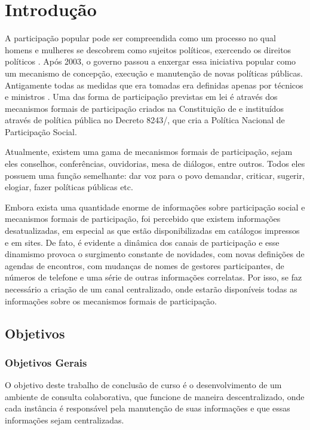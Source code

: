 \chapter{Introdução}

A participação popular pode ser compreendida como um processo no qual homens e mulheres se descobrem como sujeitos políticos, exercendo os direitos políticos \cite{almeida2011participacao}. Após 2003, o governo passou a enxergar essa iniciativa popular como um mecanismo de concepção, execução e manutenção de novas políticas públicas. Antigamente todas as medidas que era tomadas era definidas apenas por técnicos e ministros \cite{sgpr2010conselhos}.
%
Uma das forma de participação previstas em lei é através dos mecanismos formais de participação criados na Constituição de \citeyear{cf} e instituídos através de política pública no Decreto 8243/\citeyear{decreto8243}, que cria a Política Nacional de Participação Social.

Atualmente, existem uma gama de mecanismos formais de participação, sejam eles conselhos, conferências, ouvidorias, mesa de diálogos, entre outros. Todos eles possuem uma função semelhante: dar voz para o povo demandar, criticar, sugerir, elogiar, fazer políticas públicas etc. 

Embora exista uma quantidade enorme de informações sobre participação social e mecanismos formais de participação, foi percebido que existem informações desatualizadas, em especial as que estão disponibilizadas em catálogos impressos e em sites.
%
De fato, é evidente a dinâmica dos canais de participação e esse dinamismo provoca o surgimento constante de novidades, com novas definições de agendas de encontros, com mudanças de nomes de gestores participantes, de números de telefone e uma série de outras informações correlatas. Por isso, se faz necessário a criação de um canal centralizado, onde estarão disponíveis todas as informações sobre os mecanismos formais de participação.

\section{Objetivos}

\subsection{Objetivos Gerais}

O objetivo deste trabalho de conclusão de curso é o desenvolvimento de um ambiente de consulta colaborativa, que funcione de maneira descentralizado, onde cada instância é responsável pela manutenção de suas informações e que essas informações sejam centralizadas. 

